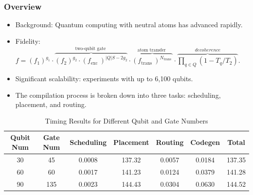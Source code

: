 \documentclass[18 pt]{beamer}
\begin{document}
\begin{frame}
    \frametitle{Overview}
    \begin{itemize}
        \item Background: Quantum computing with neutral atoms has advanced rapidly.
        \item Fidelity: \(f=\left(f_{1}\right)^{g_{1}} \cdot \overbrace{\left(f_{2}\right)^{g_{2}} \cdot\left(f_{\text {exc }}\right)^{|Q| S-2 g_{2}}}^{\text {two-qubit gate }} \cdot \overbrace{\left(f_{\text {trans }}\right)^{N_{\text {trans }}}}^{\text {atom transfer }}\cdot \overbrace{\prod_{q\in Q} (1-T_q/T_2)}^{decoherence}\).
        \item Significant scalability: experiments with up to 6,100 qubits.
        \item The compilation process is broken down into three tasks: scheduling, placement, and routing.
    \end{itemize}
    \begin{table}[h!]
        \centering
        \scriptsize
        \begin{tabular}{|c|c|c|c|c|c|c|}
        \hline
        \textbf{Qubit Num} & \textbf{Gate Num} & \textbf{Scheduling} & \textbf{Placement} & \textbf{Routing} & \textbf{Codegen} & \textbf{Total} \\
        \hline
        30 & 45 & 0.0008 & 137.32 & 0.0057 & 0.0184 & 137.35 \\
        \hline
        60 & 60 & 0.0017 & 141.23 & 0.0124 & 0.0379 & 141.28 \\
        \hline
        90 & 135 & 0.0023 & 144.43 & 0.0304 & 0.0630 & 144.52 \\
        \hline
        \end{tabular}
        \caption{Timing Results for Different Qubit and Gate Numbers}
        \label{table:timing_results}
    \end{table}
\end{frame}
\end{document}
